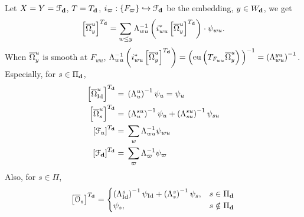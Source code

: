 \begin{eg}
Let $X=Y=\mathcal{F}_{\mathbf{d}}$, $T=T_{\mathbf{d}}$, $i_{\varpi}: \{F_{\varpi}\} \hookrightarrow \mathcal{F}_{\mathbf{d}}$ be the embedding, $y \in W_{\mathbf{d}}$, we get
$$\left[  \overline{\Omega}_{y}^{u} \right]^{T_{\mathbf{d}}}= \sum_{w \leq y} \Lambda_{wu}^{-1}\left(  i_{wu}^{*} \left[  \overline{\Omega}_y^{u} \right]^{T_{\mathbf{d}}} \right) \cdot \psi_{wu}.$$
When $\overline{\Omega}_{y}^{u}$ is smooth at $F_{wu}$, $\Lambda_{wu}^{-1}\left(  i_{wu}^{*} \left[  \overline{\Omcell}_y^{u} \right]^{T_{\dimvec{d}}} \right) = \left( \eu \left( T_{F_{wu}} \overline{\Omcell}_{y}^{u}  \right)\rule{0mm}{4mm} \right)^{-1} = \left(\Lambda_{wu}^{yu}\right)^{-1}$. Especially, for $s \in \Pi_{\mathbf{d}}$,
\begin{equation*}
\begin{aligned}
  \left[  \overline{\Omega}_{\operatorname{\operatorname{Id}}}^{u} \right]^{T_{\mathbf{d}}}=\;&  \left( \Lambda_{u}^{u}  \right)^{-1} \psi_{u}=\psi_{u} \\
  \left[  \overline{\Omega}_{s}^{u} \right]^{T_{\mathbf{d}}}=\;&  \left( \Lambda_{u}^{su}  \right)^{-1} \psi_{u} + \left( \Lambda_{su}^{su}  \right)^{-1} \psi_{su} \\
  \left[  \mathcal{F}_{u} \right]^{T_{\mathbf{d}}}=\;&  \sum_{w} \Lambda_{wu}^{-1} \psi_{wu} \\
  \left[  \mathcal{F}_{\mathbf{d}} \right]^{T_{\mathbf{d}}}=\;&  \sum_{\varpi} \Lambda_{\varpi}^{-1} \psi_{\varpi} \\  
\end{aligned}
\end{equation*}
Also, for $s \in \Pi$,
$$
\left[  \overline{\mathcal{O}}_s \right]^{T_{\mathbf{d}}}=
\begin{cases}
\left( \Lambda_{\operatorname{\operatorname{Id}}}^{s}  \right)^{-1} \psi_{\operatorname{\operatorname{Id}}} + \left( \Lambda_{s}^{s}  \right)^{-1} \psi_{s}, &s \in \Pi_{\mathbf{d}}\\
\psi_{s}, &s \notin \Pi_{\mathbf{d}}
\end{cases}
$$
\end{eg}

